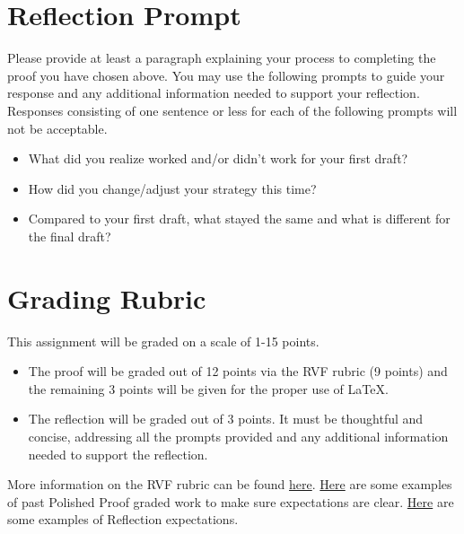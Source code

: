 \documentclass{article}
\theoremstyle{definition}
\begin{document}
\section*{Reflection Prompt}
    Please provide at least a paragraph explaining your process to completing the proof you have chosen above. You may use the following prompts to guide your response and any additional information needed to support your reflection. Responses consisting of one sentence or less for each of the following prompts will not be acceptable.
    \begin{itemize}
        \item What did you realize worked and/or didn't work for your first draft?
        \item How did you change/adjust your strategy this time?
        \item Compared to your first draft, what stayed the same and what is different for the final draft?
    \end{itemize}

\section*{Grading Rubric}
    This assignment will be graded on a scale of 1-15 points.
    \begin{itemize}
    \item The proof will be graded out of 12 points via the RVF rubric (9 points) and the remaining 3 points will be given for the proper use of \LaTeX.
    \item The reflection will be graded out of 3 points. It must be thoughtful and concise, addressing all the prompts provided and any additional information needed to support the reflection.
    \end{itemize}
     
    More information on the RVF rubric can be found 
    \href{https://drive.google.com/file/d/1P0OBjw-GkX64uCpYcqYmXARapf9MwaiI/view?usp=sharing}{here}. 
    \href{https://drive.google.com/file/d/1KAFQ7GBFpfUkyTBRZ30h5o6nXWwYDSML/view?usp=sharing}{Here} 
    are some examples of past Polished Proof graded work to make sure expectations are clear. \href{https://docs.google.com/document/d/1GcCZI_ueOWXlBC9xIBietOw1uEzFIyg-TzuHvbCZumU/edit?usp=sharing}{Here} are some examples of Reflection expectations.


	
\end{document}
